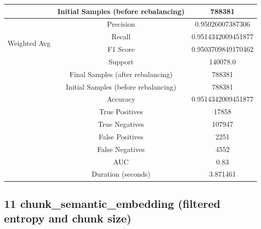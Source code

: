 \begin{longtable}{|c|c|c|}
 & Initial Samples (before rebalancing) & 788381 \\
\hline
\multirow{4}{*}{Weighted Avg} & Precision & 0.95026007387306 \\
 & Recall & 0.9514342009451877 \\
 & F1 Score & 0.9503709849170462 \\
 & Support & 140078.0 \\
 & Final Samples (after rebalancing) & 788381 \\
 & Initial Samples (before rebalancing) & 788381 \\
\hline
& Accuracy & 0.9514342009451877 \\ \hline
& True Positives & 17858 \\ \hline
& True Negatives & 107947 \\ \hline
& False Positives & 2251 \\ \hline
& False Negatives & 4552 \\ \hline
& AUC & 0.83 \\ \hline
& Duration (seconds) & 3.871461 \\ \hline
\end{longtable}


\subsection{11 chunk\_semantic\_embedding (filtered entropy and chunk size)}

